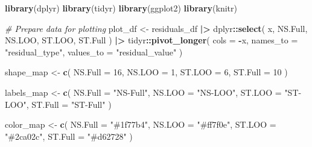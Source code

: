 \documentclass[
]{article}
\newenvironment{Shaded}{\begin{snugshade}}{\end{snugshade}}
\newcommand{\AttributeTok}[1]{\textcolor[rgb]{0.13,0.29,0.53}{#1}}
\newcommand{\CommentTok}[1]{\textcolor[rgb]{0.56,0.35,0.01}{\textit{#1}}}
\newcommand{\DecValTok}[1]{\textcolor[rgb]{0.00,0.00,0.81}{#1}}
\newcommand{\FunctionTok}[1]{\textcolor[rgb]{0.13,0.29,0.53}{\textbf{#1}}}
\newcommand{\NormalTok}[1]{#1}
\newcommand{\OtherTok}[1]{\textcolor[rgb]{0.56,0.35,0.01}{#1}}
\newcommand{\SpecialCharTok}[1]{\textcolor[rgb]{0.81,0.36,0.00}{\textbf{#1}}}
\newcommand{\StringTok}[1]{\textcolor[rgb]{0.31,0.60,0.02}{#1}}
\begin{document}
\begin{Shaded}
\begin{Highlighting}[]
\FunctionTok{library}\NormalTok{(dplyr)}
\FunctionTok{library}\NormalTok{(tidyr)}
\FunctionTok{library}\NormalTok{(ggplot2)}
\FunctionTok{library}\NormalTok{(knitr)}

\CommentTok{\# Prepare data for plotting}
\NormalTok{plot\_df }\OtherTok{\textless{}{-}}\NormalTok{ residuals\_df }\SpecialCharTok{|\textgreater{}}
\NormalTok{  dplyr}\SpecialCharTok{::}\FunctionTok{select}\NormalTok{(}
\NormalTok{    x,}
\NormalTok{    NS.Full,}
\NormalTok{    NS.LOO,}
\NormalTok{    ST.LOO,}
\NormalTok{    ST.Full}
\NormalTok{  ) }\SpecialCharTok{|\textgreater{}}
\NormalTok{  tidyr}\SpecialCharTok{::}\FunctionTok{pivot\_longer}\NormalTok{(}
    \AttributeTok{cols =} \SpecialCharTok{{-}}\NormalTok{x,}
    \AttributeTok{names\_to =} \StringTok{"residual\_type"}\NormalTok{,}
    \AttributeTok{values\_to =} \StringTok{"residual\_value"}
\NormalTok{  )}

\NormalTok{shape\_map }\OtherTok{\textless{}{-}} \FunctionTok{c}\NormalTok{(}
  \AttributeTok{NS.Full =} \DecValTok{16}\NormalTok{,}
  \AttributeTok{NS.LOO  =} \DecValTok{1}\NormalTok{,}
  \AttributeTok{ST.LOO  =} \DecValTok{6}\NormalTok{,}
  \AttributeTok{ST.Full =} \DecValTok{10}
\NormalTok{)}

\NormalTok{labels\_map }\OtherTok{\textless{}{-}} \FunctionTok{c}\NormalTok{(}
  \AttributeTok{NS.Full =} \StringTok{"NS{-}Full"}\NormalTok{,}
  \AttributeTok{NS.LOO  =} \StringTok{"NS{-}LOO"}\NormalTok{,}
  \AttributeTok{ST.LOO  =} \StringTok{"ST{-}LOO"}\NormalTok{,}
  \AttributeTok{ST.Full =} \StringTok{"ST{-}Full"}
\NormalTok{)}

\NormalTok{color\_map }\OtherTok{\textless{}{-}} \FunctionTok{c}\NormalTok{(}
  \AttributeTok{NS.Full =} \StringTok{"\#1f77b4"}\NormalTok{,}
  \AttributeTok{NS.LOO  =} \StringTok{"\#ff7f0e"}\NormalTok{,}
  \AttributeTok{ST.LOO  =} \StringTok{"\#2ca02c"}\NormalTok{,}
  \AttributeTok{ST.Full =} \StringTok{"\#d62728"}
\NormalTok{)}


\end{Highlighting}
\end{Shaded}
\end{document}
